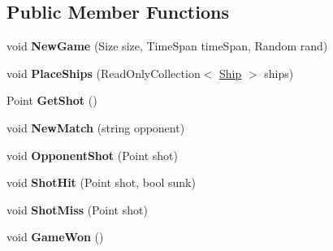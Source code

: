 \subsection*{Public Member Functions}
\begin{DoxyCompactItemize}
\item 
\hypertarget{class_m_b_c_1_1_controllers_1_1_random_bot_af9e514b31d63c13e2d81605e3484af26}{void {\bfseries New\-Game} (Size size, Time\-Span time\-Span, Random rand)}\label{class_m_b_c_1_1_controllers_1_1_random_bot_af9e514b31d63c13e2d81605e3484af26}

\item 
\hypertarget{class_m_b_c_1_1_controllers_1_1_random_bot_ac0605649e030bbd7d70d50d2764c14f8}{void {\bfseries Place\-Ships} (Read\-Only\-Collection$<$ \hyperlink{class_m_b_c_1_1_core_1_1_ship}{Ship} $>$ ships)}\label{class_m_b_c_1_1_controllers_1_1_random_bot_ac0605649e030bbd7d70d50d2764c14f8}

\item 
\hypertarget{class_m_b_c_1_1_controllers_1_1_random_bot_a6913b193a39e760dbb0372f9f7f530db}{Point {\bfseries Get\-Shot} ()}\label{class_m_b_c_1_1_controllers_1_1_random_bot_a6913b193a39e760dbb0372f9f7f530db}

\item 
\hypertarget{class_m_b_c_1_1_controllers_1_1_random_bot_a73005313c7c4aa407eb62c785ea33f30}{void {\bfseries New\-Match} (string opponent)}\label{class_m_b_c_1_1_controllers_1_1_random_bot_a73005313c7c4aa407eb62c785ea33f30}

\item 
\hypertarget{class_m_b_c_1_1_controllers_1_1_random_bot_acc20322c0e64b17dc830c7dd605a1b0f}{void {\bfseries Opponent\-Shot} (Point shot)}\label{class_m_b_c_1_1_controllers_1_1_random_bot_acc20322c0e64b17dc830c7dd605a1b0f}

\item 
\hypertarget{class_m_b_c_1_1_controllers_1_1_random_bot_a0bf8aa243be03ada21bb300e7238d0be}{void {\bfseries Shot\-Hit} (Point shot, bool sunk)}\label{class_m_b_c_1_1_controllers_1_1_random_bot_a0bf8aa243be03ada21bb300e7238d0be}

\item 
\hypertarget{class_m_b_c_1_1_controllers_1_1_random_bot_ab3246f7e268ca4be0bef0ae3f9f990f8}{void {\bfseries Shot\-Miss} (Point shot)}\label{class_m_b_c_1_1_controllers_1_1_random_bot_ab3246f7e268ca4be0bef0ae3f9f990f8}

\item 
\hypertarget{class_m_b_c_1_1_controllers_1_1_random_bot_a61d68e93efa720166f1f43aa10d30679}{void {\bfseries Game\-Won} ()}\label{class_m_b_c_1_1_controllers_1_1_random_bot_a61d68e93efa720166f1f43aa10d30679}


\end{DoxyCompactItemize}
